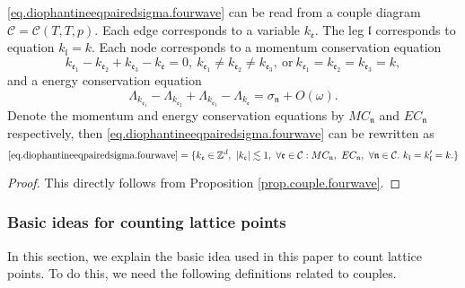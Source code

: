 \begin{prop}\label{prop.couple'.fourwave}
\eqref{eq.diophantineeqpairedsigma.fourwave} can be read from a couple diagram $\mathcal{C}=\mathcal{C}(T,T,p)$. Each edge corresponds to a variable $k_{\mathfrak{e}}$. The leg $\mathfrak{l}$ corresponds to equation $k_{\mathfrak{l}}=k$. Each node corresponds to a momentum conservation equation
\begin{equation}\label{eq.momentumconservationunit.fourwave}
    k_{\mathfrak{e}_1}-k_{\mathfrak{e}_2}+k_{\mathfrak{e}_3}-k_{\mathfrak{e}}=0,\ k_{\mathfrak{e}_1}\ne k_{\mathfrak{e}_2}\ne k_{\mathfrak{e}_3},\ \text{or}\ k_{\mathfrak{e}_1}= k_{\mathfrak{e}_2}= k_{\mathfrak{e}_3}=k,
\end{equation} 
and a energy conservation equation 
\begin{equation}\label{eq.energyconservationunit.fourwave}
    \Lambda_{k_{\mathfrak{e}_1}}-\Lambda_{k_{\mathfrak{e}_2}}+\Lambda_{k_{\mathfrak{e}_3}}-\Lambda_{k_{\mathfrak{e}}} =\sigma_{\mathfrak{n}}+O(\omega).
\end{equation}  
Denote the momentum and energy conservation equations by $MC_{\mathfrak{n}}$ and $EC_{\mathfrak{n}}$ respectively, then \eqref{eq.diophantineeqpairedsigma.fourwave} can be rewritten as 
\begin{equation}\label{eq.diophantineeqpairedsigma'.fourwave}
    \text{\eqref{eq.diophantineeqpairedsigma.fourwave}}=\{k_{\mathfrak{e}}\in \mathbb{Z}^d,\ |k_{\mathfrak{e}}| \lesssim 1,\ \forall \mathfrak{e}\in \mathcal{C}:MC_{\mathfrak{n}},\  EC_{\mathfrak{n}},\ \forall \mathfrak{n}\in \mathcal{C}.\ k_{\mathfrak{l}}=k_{\mathfrak{l}}'=k.\}
\end{equation}
\end{prop}
\begin{proof}
This directly follows from Proposition \ref{prop.couple.fourwave}. 
\end{proof}

\subsubsection{Basic ideas for counting lattice points} In this section, we explain the basic idea used in this paper to count lattice points. To do this, we need the following definitions related to couples.

